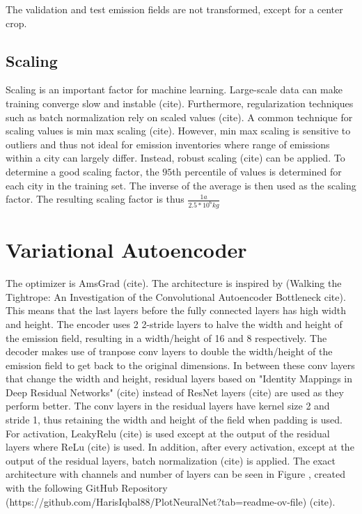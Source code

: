 The validation and test emission fields are not transformed, except for a center crop.

\subsection{Scaling}
Scaling is an important factor for machine learning.
Large-scale data can make training converge slow and instable (cite).
Furthermore, regularization techniques such as batch normalization rely on scaled values (cite).
A common technique for scaling values is min max scaling (cite).
However, min max scaling is sensitive to outliers and thus not ideal for emission inventories where range of emissions within a city can largely differ.
Instead, robust scaling (cite) can be applied.
To determine a good scaling factor, the $95$th percentile of values is determined for each city in the training set.
The inverse of the average is then used as the scaling factor.
The resulting scaling factor is thus $\frac{1 a}{2.5 * 10^6 kg}$

\section{Variational Autoencoder}
The optimizer is AmsGrad (cite).
The architecture is inspired by (Walking the Tightrope: An Investigation of the Convolutional Autoencoder Bottleneck cite).
This means that the last layers before the fully connected layers has high width and height.
The encoder uses 2 2-stride layers to halve the width and height of the emission field, resulting in a width/height of 16 and 8 respectively.
The decoder makes use of tranpose conv layers to double the width/height of the emission field to get back to the original dimensions.
In between these conv layers that change the width and height, residual layers based on "Identity Mappings in Deep Residual Networks" (cite) instead of ResNet layers (cite) are used as they perform better.
The conv layers in the residual layers have kernel size 2 and stride 1, thus retaining the width and height of the field when padding is used.
For activation, LeakyRelu (cite) is used except at the output of the residual layers where ReLu (cite) is used.
In addition, after every activation, except at the output of the residual layers, batch normalization (cite) is applied.
The exact architecture with channels and number of layers can be seen in Figure , created with the following GitHub Repository (https://github.com/HarisIqbal88/PlotNeuralNet?tab=readme-ov-file) (cite).

